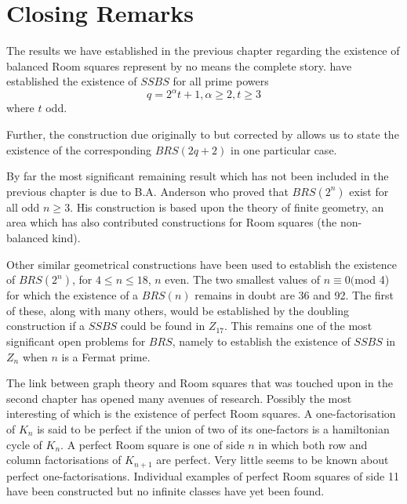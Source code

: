 \chapter{Closing Remarks}
\label{ch:closing-remarks}

The results we have established in the previous chapter regarding the existence of balanced Room squares represent by no means the complete story.
\cite{duExistenceSymmetricSkew1988} have established the existence of $SSBS$ for all prime powers
\begin{equation}
q = 2^{\alpha}t + 1, \alpha \geq 2, t \geq 3
\end{equation}
where $t$ odd.

Further, the construction due originally to
\cite{hwangCompleteBalancedHowell1984}
but corrected by
\cite{andersonConstructionBalancedRoom1999}
allows us to state the existence of the corresponding $BRS(2q + 2)$ in one particular case.

By far the most significant remaining result which has not been included in the previous chapter is due to B.A. Anderson who proved that $BRS(2^n)$ exist for all odd $n \geq 3$.
His construction is based upon the theory of finite geometry, an area which has also contributed constructions for Room squares (the non-balanced kind).

Other similar geometrical constructions have been used to establish the existence of $BRS(2^n)$, for $4 \leq n \leq 18$, $n$ even.
The two smallest values of $n \equiv 0($mod 4) for which the existence of a $BRS(n)$ remains in doubt are 36 and 92.
The first of these, along with many others, would be established by the doubling construction if a $SSBS$ could be found in $Z_{17}$.
This remains one of the most significant open problems for $BRS$, namely to establish the existence of $SSBS$ in $Z_n$ when $n$ is a Fermat prime.

The link between graph theory and Room squares that was touched upon in the second chapter has opened many avenues of research.
Possibly the most interesting of which is the existence of perfect Room squares.
A one-factorisation of $K_n$ is said to be perfect if the union of two of its one-factors is a hamiltonian cycle of $K_n$.
A perfect Room square is one of side $n$ in which both row and column factorisations of $K_{n + 1}$ are perfect.
Very little seems to be known about perfect one-factorisations.
Individual examples of perfect Room squares of side 11 have been constructed but no infinite classes have yet been found.
